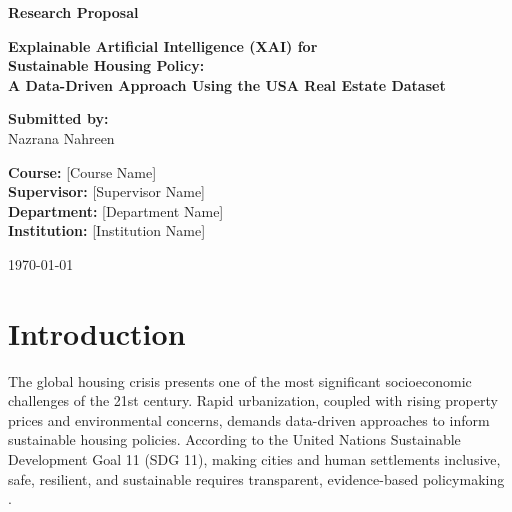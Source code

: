 \documentclass[12pt, a4paper]{article}
\begin{document}
\begin{titlepage}
\begin{center}

\vspace*{2cm}

{\LARGE \textbf{Research Proposal}}

\vspace{1cm}

{\Large \textbf{Explainable Artificial Intelligence (XAI) for\\
Sustainable Housing Policy:\\
A Data-Driven Approach Using the USA Real Estate Dataset}}

\vspace{2cm}

{\large
\textbf{Submitted by:}\\[0.3cm]
Nazrana Nahreen\\
}

\vspace{2cm}

{\large
\textbf{Course:} [Course Name]\\[0.3cm]
\textbf{Supervisor:} [Supervisor Name]\\[0.3cm]
\textbf{Department:} [Department Name]\\[0.3cm]
\textbf{Institution:} [Institution Name]\\[0.3cm]
}

\vspace{2cm}

{\large \today}

\end{center}
\end{titlepage}

\tableofcontents
\newpage

\section{Introduction}

The global housing crisis presents one of the most significant socioeconomic challenges of the 21st century. Rapid urbanization, coupled with rising property prices and environmental concerns, demands data-driven approaches to inform sustainable housing policies. According to the United Nations Sustainable Development Goal 11 (SDG 11), making cities and human settlements inclusive, safe, resilient, and sustainable requires transparent, evidence-based policymaking \citep{un2015sdg}.
\end{document}
